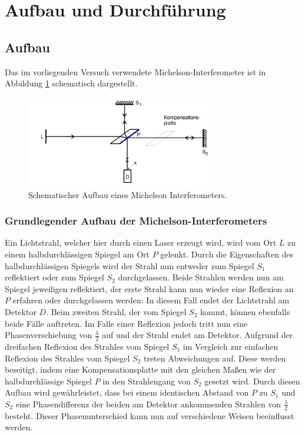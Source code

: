 \section{Aufbau und Durchführung}
\subsection{Aufbau}
\label{sec:Aufbau}

Das im vorliegenden Versuch verwendete Michelson-Interferometer ist in Abbildung \ref{abb:2} schematisch dargestellt.
\begin{figure}[H]
  \centering
  \includegraphics[height=4cm]{ressources/aufbau1.png}
  \caption{Schematischer Aufbau eines Michelson Interferometers. \cite{skript}}
  \label{abb:2}
\end{figure}

\subsubsection{Grundlegender Aufbau der Michelson-Interferometers}
Ein Lichtstrahl, welcher hier durch einen Laser erzeugt wird, wird vom Ort $L$ zu einem halbdurchlässigen Spiegel am Ort $P$ gelenkt.
Durch die Eigenschaften des halbdurchlässigen Spiegels wird der Strahl nun entweder zum Spiegel $S_1$ reflektiert oder zum Spiegel $S_2$ durchgelassen.
Beide Strahlen werden nun am Spiegel jeweiligen reflektiert, der erste Strahl kann nun wieder eine Reflexion an $P$ erfahren oder durchgelassen werden: In diesem Fall endet der Lichtstrahl am Detektor $D$.
Beim zweiten Strahl, der vom Spiegel $S_2$ kommt, können ebenfalls beide Fälle auftreten.
Im Falle einer Reflexion jedoch tritt nun eine Phasenverschiebung von $\frac{\lambda}{2}$ auf und der Strahl endet am Detektor.
Aufgrund der dreifachen Reflexion des Strahles vom Spiegel $S_1$ im Vergleich zur einfachen Reflexion des Strahles vom Spiegel $S_2$ treten Abweichungen auf.
Diese werden beseitigt, indem eine Kompensationsplatte mit den gleichen Maßen wie der halbdurchlässige Spiegel $P$ in den Strahlengang von $S_2$ gesetzt wird.
Durch diesen Aufbau wird gewährleistet, dass bei einem identischen Abstand von $P$ zu $S_1$ und $S_2$ eine Phasendifferenz der beiden am Detektor ankommenden Strahlen von $\frac{\lambda}{2}$ besteht.
Dieser Phasenunterschied kann nun auf verschiedene Weisen beeinflusst werden.

